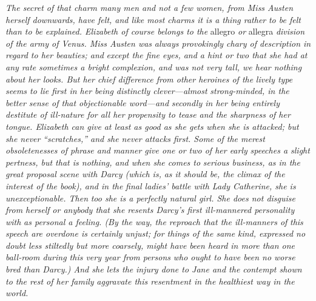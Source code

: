 \documentclass[12pt,openright]{book}
\begin{document}
\textit{The secret of that charm many men and not a few women, from Miss Austen}\textit{ }\textit{herself downwards, have felt, and like most charms it is a thing rather}\textit{ }\textit{to be felt than to be explained. Elizabeth of course belongs to the} allegro \textit{or} allegra \textit{division of the army of Venus. Miss Austen was}\textit{ }\textit{always provokingly chary of description in regard to her beauties; and}\textit{ }\textit{except the fine eyes, and a hint or two that she had at any rate}\textit{ }\textit{sometimes a bright complexion, and was not very tall, we hear nothing}\textit{ }\textit{about her looks. But her chief difference from other heroines of the}\textit{ }\textit{lively type seems to lie first in her being distinctly clever—almost}\textit{ }\textit{strong-minded, in the better sense of that objectionable word—and}\textit{ }\textit{secondly in her being entirely destitute of ill-nature for all her}\textit{ }\textit{propensity to tease and the sharpness of her tongue. Elizabeth can give}\textit{ }\textit{at least as good as she gets when she is attacked; but she never}\textit{ }\textit{“scratches,” and she never attacks first. Some of the merest}\textit{ }\textit{obsoletenesses of phrase and}\textit{ }\textit{manner give one or two of her early}\textit{ }\textit{speeches a slight pertness, but that is nothing, and when she comes to}\textit{ }\textit{serious business, as in the great proposal scene with Darcy (which is,}\textit{ }\textit{as it should be, the climax of the interest of the book), and in the}\textit{ }\textit{final ladies’ battle with Lady Catherine, she is unexceptionable. Then}\textit{ }\textit{too she is a perfectly natural girl. She does not disguise from herself}\textit{ }\textit{or anybody that she resents Darcy’s first ill-mannered personality with}\textit{ }\textit{as personal a feeling. (By the way, the reproach that the ill-manners of}\textit{ }\textit{this speech are overdone is certainly unjust; for things of the same}\textit{ }\textit{kind, expressed no doubt less stiltedly but more coarsely, might have}\textit{ }\textit{been heard in more than one ball-room during this very year from persons}\textit{ }\textit{who ought to have been no worse bred than Darcy.) And she lets the}\textit{ }\textit{injury done to Jane and the contempt shown to the rest of her family}\textit{ }\textit{aggravate this resentment in the healthiest way in the world.}
\end{document}
